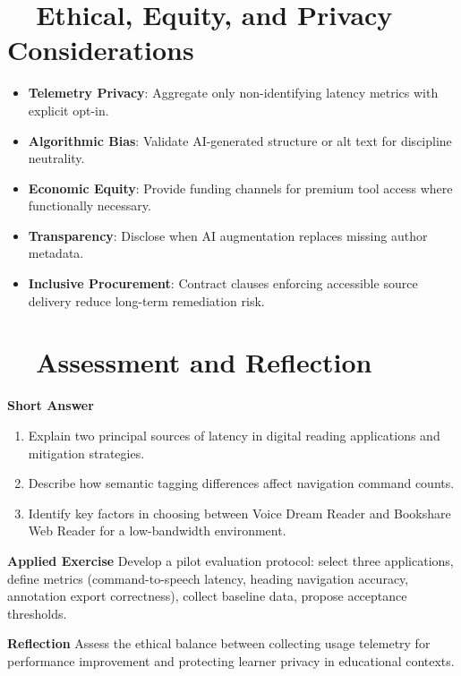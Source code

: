 \section{~~Ethical, Equity, and Privacy Considerations}
\label{sec:sr27-ethics}
\begin{itemize}
	\item \textbf{Telemetry Privacy}: Aggregate only non-identifying latency metrics with explicit opt-in\supercite{DataPrivacyAI}.
	\item \textbf{Algorithmic Bias}: Validate AI-generated structure or alt text for discipline neutrality.
	\item \textbf{Economic Equity}: Provide funding channels for premium tool access where functionally necessary.
	\item \textbf{Transparency}: Disclose when AI augmentation replaces missing author metadata.
	\item \textbf{Inclusive Procurement}: Contract clauses enforcing accessible source delivery reduce long-term remediation risk\supercite{Lazar2015, USAccessBoard2018}.
\end{itemize}

\section{~~Assessment and Reflection}
\label{sec:sr27-assessment}
\textbf{Short Answer}
\begin{enumerate}
	\item Explain two principal sources of latency in digital reading applications and mitigation strategies.
	\item Describe how semantic tagging differences affect navigation command counts.
	\item Identify key factors in choosing between Voice Dream Reader and Bookshare Web Reader for a low-bandwidth environment.
\end{enumerate}

\textbf{Applied Exercise} Develop a pilot evaluation protocol: select three applications, define metrics (command-to-speech latency, heading navigation accuracy, annotation export correctness), collect baseline data, propose acceptance thresholds.

\textbf{Reflection} Assess the ethical balance between collecting usage telemetry for performance improvement and protecting learner privacy in educational contexts.

